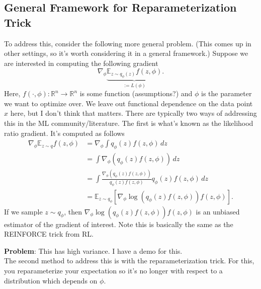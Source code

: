 \documentclass{article}
\newcommand{\dz}{\, dz}
\newcommand{\R}{\mathbb{R}}
\newcommand{\E}{\mathbb{E}}
\newcommand{\grad}{\nabla}
\begin{document}
\subsection{General Framework for Reparameterization Trick}
To address this, consider the following more general problem. (This comes up in other settings, so it's worth considering it in a general framework.) Suppose we are interested in computing the following gradient
\begin{equation} \label{eq:reparam-grad-goal}
\grad_\phi \underbrace{\E_{z\sim q_\phi(z)} f(z, \phi)}_{:= L(\phi)}.
\end{equation}
Here, $f(\cdot, \phi):\R^n \to \R^n$ is some function (assumptions?) and $\phi$ is the parameter we want to optimize over. We leave out functional dependence on the data point $x$ here, but I don't think that matters. There are typically two ways of addressing this in the ML community/literature. The first is what's known as the likelihood ratio gradient. It's computed as follows
\begin{align}
    \grad_\phi \E_{z\sim q} f(z,\phi) & = \grad_\phi \int q_\phi(z) f(z,\phi)\dz \\
    & = \int \grad_\phi\left( q_\phi(z) f(z,\phi) \right) \dz\\
    & = \int \frac{\grad_\phi\left( q_\phi(z) f(z,\phi) \right)}{q_\phi(z) f(z,\phi)}q_\phi(z) f(z,\phi) \dz\\
    & = \E_{z\sim q_\phi}\left[ \grad_\phi \log\left( q_\phi(z) f(z,\phi) \right) f(z,\phi) \right].
\end{align}
If we sample $z\sim q_\phi$, then $\grad_\phi \log\left( q_\phi(z) f(z,\phi) \right) f(z,\phi)$ is an unbiased estimator of the gradient of interest. Note this is basically the same as the REINFORCE trick from RL. 

\vspace{1em}
\noindent \textbf{Problem}: This has high variance. I have a demo for this. \\


The second method to address this is with the reparameterization trick. For this, you reparameterize your expectation so it's no longer with respect to a distribution which depends on $\phi$. 
\end{document}
